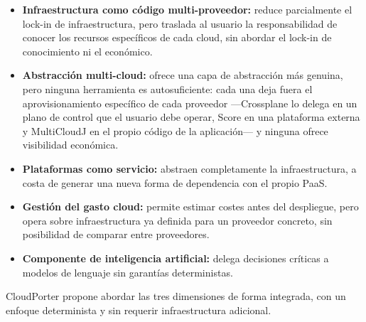 \begin{itemize}
    \item \textbf{Infraestructura como código multi-proveedor:} reduce parcialmente
    el lock-in de infraestructura, pero traslada al usuario la responsabilidad de
    conocer los recursos específicos de cada cloud, sin abordar el lock-in de
    conocimiento ni el económico.

    \item \textbf{Abstracción multi-cloud:} ofrece una capa de abstracción más
    genuina, pero ninguna herramienta es autosuficiente: cada una deja fuera el
    aprovisionamiento específico de cada proveedor —Crossplane lo delega en un plano
    de control que el usuario debe operar, Score en una plataforma externa y
    MultiCloudJ en el propio código de la aplicación— y ninguna ofrece visibilidad
    económica.

    \item \textbf{Plataformas como servicio:} abstraen completamente la
    infraestructura, a costa de generar una nueva forma de dependencia con el propio
    PaaS.

    \item \textbf{Gestión del gasto cloud:} permite estimar costes antes del
    despliegue, pero opera sobre infraestructura ya definida para un proveedor
    concreto, sin posibilidad de comparar entre proveedores.

    \item \textbf{Componente de inteligencia artificial:} delega decisiones críticas
    a modelos de lenguaje sin garantías deterministas.
\end{itemize}

CloudPorter propone abordar las tres dimensiones de forma integrada, con un
enfoque determinista y sin requerir infraestructura adicional.
